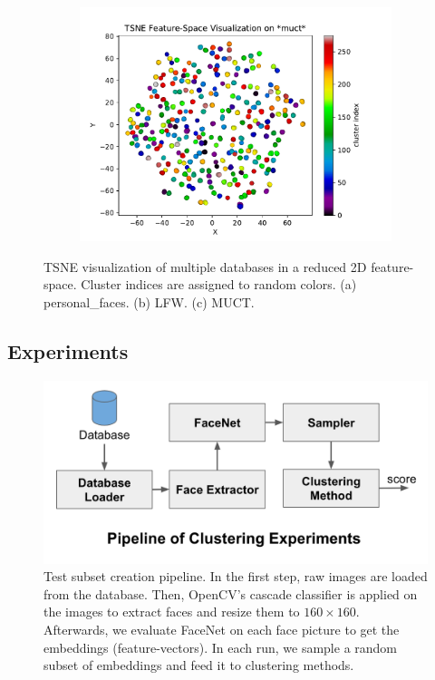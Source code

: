 \documentclass[conference]{IEEEtran}
\begin{document}
\begin{figure}[h]
\begin{subfigure}[b]{0.5\textwidth}
    \includegraphics[width=\linewidth]{tsne_view_muct}
    \caption{}
  \end{subfigure}
  \caption{TSNE visualization of multiple databases in a reduced 2D feature-space. Cluster indices are assigned to random colors. (a) personal\_faces. (b) LFW. (c) MUCT.}
  \label{tsneview}
\end{figure}

\subsection{Experiments}

\begin{figure}[h]
  \includegraphics[width=\linewidth]{pipeline.png}
  \caption{Test subset creation pipeline. In the first step, raw images are loaded from the database. Then, OpenCV's cascade classifier is applied on the images to extract faces and resize them to $160\times160$. Afterwards, we evaluate FaceNet on each face picture to get the embeddings (feature-vectors). In each run, we sample a random subset of embeddings and feed it to clustering methods.}
  \label{pipeline}
\end{figure}
\end{document}
